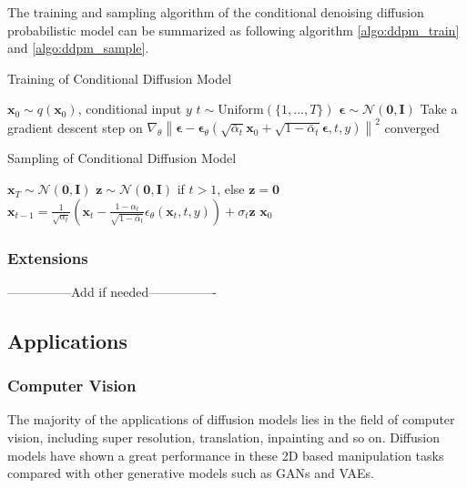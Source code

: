 \documentclass[12pt,DIV14,BCOR12mm,a4paper,footinclude=false,headinclude,parskip=half-,twoside,openright,cleardoublepage=empty,toc=index,bibliography=totoc,listof=totoc]{scrreprt}
\numberwithin{equation}{chapter}
\begin{document}
The training and sampling algorithm of the conditional denoising diffusion probabilistic model can be summarized as following algorithm \ref{algo:ddpm_train} and \ref{algo:ddpm_sample}.
\begin{algorithm}[H]
  \caption{Training of Conditional Diffusion Model}
  \label{algo:ddpm_train}
  \begin{algorithmic}[1]
    \Repeat
      \State $\mathbf{x}_{0}\sim q(\mathbf{x}_{0})$, conditional input $y$
      \State $t\sim \text{Uniform}(\{1,...,T\})$
      \State $\mathbf{\epsilon}\sim \mathcal{N} (\mathbf{0}, \mathbf{I})$
      \State Take a gradient descent step on $\nabla_{\theta}\left\lVert\boldsymbol{\epsilon} - \boldsymbol{\epsilon}_{\theta}(\sqrt{\bar{\alpha}_{t}}\mathbf{x}_{0} + \sqrt{1 - \bar{\alpha}_{t}}\boldsymbol{\epsilon}, t, y)\right\rVert ^{2}$ 
    \Until converged
  \end{algorithmic}
\end{algorithm}
\begin{algorithm}[H]
  \caption{Sampling of Conditional Diffusion Model}
  \label{algo:ddpm_sample}
  \begin{algorithmic}[1]
    \State $\mathbf{x}_{T}\sim \mathcal{N} (\mathbf{0}, \mathbf{I})$
      \State $\mathbf{z}\sim \mathcal{N} (\mathbf{0}, \mathbf{I})$ if $t>1$, else $\mathbf{z} = \mathbf{0}$
      \State $\mathbf{x}_{t-1}=\frac{1}{\sqrt{\alpha_{t}}}\left(\mathbf{x}_{t} - \frac{1-\alpha_{t}}{\sqrt{1-\bar{\alpha}_{t}}}\epsilon_{\theta}(\mathbf{x}_{t},t,y)\right) + \sigma_{t}\mathbf{z}$
    \EndFor
    \State \Return $\mathbf{x}_{0}$
  \end{algorithmic}
\end{algorithm}
\subsubsection{Extensions}
---------------Add if needed----------------
\subsection{Applications}

\subsubsection{Computer Vision}
The majority of the applications of diffusion models lies in the field of computer vision, including super resolution, translation, inpainting and so on\cite{yang2023diffusion}. Diffusion models have shown a great performance in these 2D based manipulation tasks compared with other generative models such as GANs and VAEs.
\end{document}
